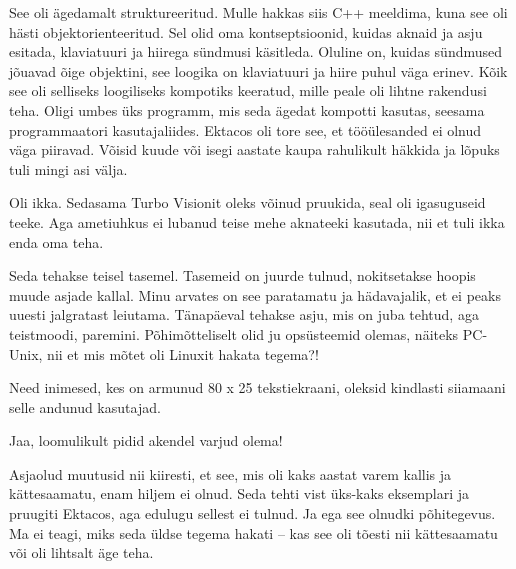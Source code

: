 
See oli ägedamalt struktureeritud. Mulle hakkas siis 
C++ meeldima, kuna see oli hästi objektorienteeritud. Sel olid 
oma kontseptsioonid, kuidas aknaid ja asju esitada, klaviatuuri ja hiirega 
sündmusi käsitleda. Oluline on, kuidas sündmused jõuavad õige objektini, see loogika on klaviatuuri 
ja hiire puhul väga erinev. Kõik see oli selliseks loogiliseks kompotiks keeratud, mille peale oli lihtne rakendusi teha. Oligi umbes üks programm, mis seda ägedat kompotti kasutas, seesama programmaatori kasutajaliides. Ektacos oli tore see, et 
tööülesanded ei olnud väga piiravad. Võisid kuude või isegi aastate kaupa rahulikult häkkida ja lõpuks tuli mingi asi 
välja. 


Oli ikka. Sedasama Turbo Visionit oleks võinud pruukida, seal oli 
igasuguseid teeke. Aga ametiuhkus ei lubanud 
teise mehe aknateeki kasutada, nii et tuli ikka enda oma teha. 


Seda tehakse teisel tasemel. Tasemeid on juurde tulnud, 
nokitsetakse hoopis muude asjade kallal. Minu arvates on see
paratamatu ja hädavajalik, et ei peaks uuesti
jalgratast leiutama. Tänapäeval tehakse asju, mis on juba tehtud, aga teistmoodi, 
paremini. Põhimõtteliselt olid ju opsüsteemid olemas, näiteks PC-Unix, nii et mis mõtet oli 
Linuxit hakata tegema?! 



Need inimesed, kes on armunud 80 x 25 tekstiekraani, oleksid kindlasti siiamaani selle andunud kasutajad. 


Jaa, loomulikult pidid akendel varjud olema!


Asjaolud muutusid nii kiiresti, et see, mis oli kaks aastat varem kallis ja kättesaamatu, enam hiljem ei olnud. Seda tehti vist üks-kaks eksemplari ja pruugiti Ektacos, aga edulugu sellest ei tulnud. Ja ega see olnudki põhitegevus. 
Ma ei teagi, miks seda üldse tegema hakati -- kas see oli tõesti 
nii kättesaamatu või oli lihtsalt äge teha.

